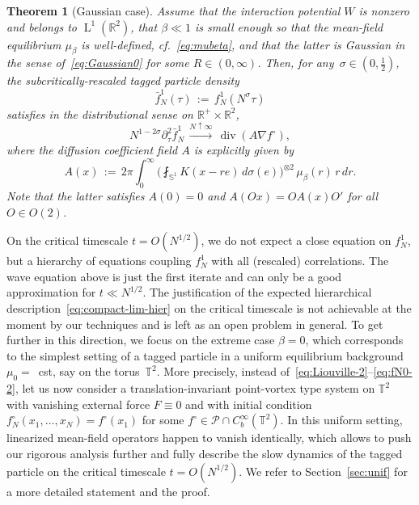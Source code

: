 \documentclass[a4paper,11pt,reqno,noindent]{amsart}
\theoremstyle{plain}
\newtheorem{theor}[lem]{Theorem}
\numberwithin{equation}{section}
\newcommand{\R}{\mathbb R}
\newcommand{\T}{\mathbb T}
\newcommand{\Pc}{\mathcal P}
\newcommand{\Sp}{\mathbb S}
\newcommand{\Div}{{\operatorname{div}}}
\newcommand{\3}{|\!|\!|}
\newcommand{\Ld}{\operatorname{L}}
\begin{document}
\begin{theor}[Gaussian case]\label{th:main-Gauss}
Assume that the interaction potential $W$ is nonzero and belongs to $\Ld^1(\R^2)$, {that $\beta\ll1$ is small enough so that the mean-field equilibrium $\mu_\beta$ is well-defined, cf.~\eqref{eq:mubeta},
and that the latter} is Gaussian in the sense of~\eqref{eq:Gaussian0} for some \mbox{$R\in(0,\infty)$}.
Then, for any~\mbox{$\sigma\in(0,\frac12)$}, the subcritically-rescaled tagged particle density
\[\bar f_N^1(\tau)\,:=\,{f_N^1(N^\sigma\tau)}\]
satisfies in the distributional sense on $\R^+\times\R^2$,
\begin{equation*}
{N^{1-2\sigma}\partial_\tau^2\bar f_N^{1}}
\,\xrightarrow{N\uparrow\infty}\,\Div( A\nabla f^\circ),
\end{equation*}
where the diffusion coefficient field $A$ is explicitly given by
\begin{equation}\label{eq:def-coeff-A-proj}
A(x)\,:=\,2\pi\int_{0}^\infty \Big(\fint_{\Sp^{1}} K(x-re)\,d\sigma(e)\Big)^{\otimes2}\,\mu_\beta(r)\,r\,dr.
\end{equation}
Note that the latter satisfies $A(0)=0$ and $A(Ox)=OA(x)O'$ for all $O\in O(2)$.
\end{theor}

{On the critical timescale $t=O(N^{1/2})$, we do not expect a close equation on $f_N^1$, but a hierarchy of equations coupling $f_N^1$ with all (rescaled) correlations. The wave equation above is just the first iterate and can only be a good approximation for $t\ll N^{1/2}$. The justification of the} expected hierarchical description~\eqref{eq:compact-lim-hier} on the critical timescale is not achievable at the moment by our techniques and is left as an open problem in general.
To get further in this direction, we focus on the extreme case $\beta=0$, which corresponds to the simplest setting of a tagged particle in a uniform equilibrium background \mbox{$\mu_0=$ cst,} say on the torus~$\T^2$. More precisely, instead of~\eqref{eq:Liouville-2}--\eqref{eq:fN0-2}, let us now consider a translation-invariant point-vortex type system on $\T^2$ with vanishing external force $F\equiv0$ and with initial condition $f_N^\circ(x_1,\ldots,x_N)=f^\circ(x_1)$ for some $f^\circ\in\Pc\cap C^\infty_b(\T^2)$.
In this uniform setting, linearized mean-field operators happen to vanish identically, which allows to push our rigorous analysis further and fully describe the slow dynamics of the tagged particle on the critical timescale $t=O(N^{1/2})$.
We refer to Section~\ref{sec:unif} for a more detailed statement and the proof.
\end{document}
